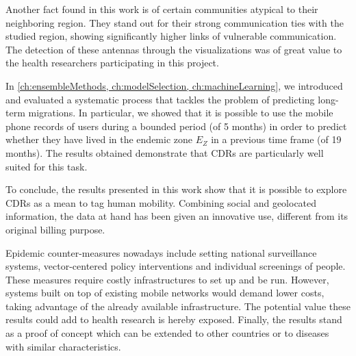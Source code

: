 Another fact found in this work is of certain communities atypical to their neighboring region.
They stand out for their strong communication ties with the studied region, showing significantly higher links of vulnerable communication.
The detection of these antennas through the visualizations was of great value to the health researchers participating in this project.

In \cref{ch:ensembleMethods, ch:modelSelection, ch:machineLearning}, we introduced and evaluated a systematic process that tackles the problem of predicting long-term migrations.
In particular, we showed that it is possible to use the mobile phone records of users during a bounded period (of 5 months) in order to predict whether they have lived in the endemic zone $E_Z$ in a previous time frame (of 19 months).
The results obtained demonstrate that CDRs are particularly well suited for this task.

To conclude, the results presented in this work show that it is possible to explore CDRs as a mean to tag human mobility.
Combining social and geolocated information, the data at hand has been given an innovative use, different from its original billing purpose.

Epidemic counter-measures nowadays include setting national surveillance systems, vector-centered policy interventions and individual screenings of people. These measures require costly infrastructures to set up and be run. However, systems built on top of existing mobile networks would demand lower costs, taking advantage of the already available infrastructure. The potential value these results could add to health research is hereby exposed.
Finally, the results stand as a proof of concept which can be extended to other countries or to diseases with similar characteristics.











